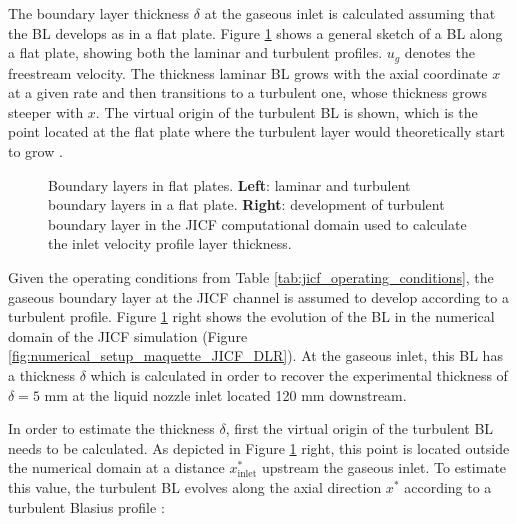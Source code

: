 The boundary layer thickness $\delta$ at the gaseous inlet is calculated assuming that the BL develops as in a flat plate. Figure \ref{fig:BLs_gaseous_inlet_setup} shows a general sketch of a BL along a flat plate, showing both the laminar and turbulent profiles. $u_g$ denotes the freestream velocity. The thickness laminar BL grows with the axial coordinate $x$ at a given rate and then transitions to a turbulent one, whose thickness grows steeper with $x$. The virtual origin of the turbulent BL is shown, which is the point located at the flat plate where the turbulent layer would theoretically start to grow .

\begin{figure}[ht]
     \centering
     \begin{subfigure}[b]{0.45\textwidth}
         \centering
     \end{subfigure}
     \begin{subfigure}[b]{0.45\textwidth} 
         \centering
     \end{subfigure}
        \caption[Boundary layers in flat plates]{Boundary layers in flat plates. \textbf{Left}: laminar and turbulent boundary layers in a flat plate. \textbf{Right}: development of turbulent boundary layer in the JICF computational domain used to calculate the inlet velocity profile layer thickness.}
        \label{fig:BLs_gaseous_inlet_setup}
\end{figure}

Given the operating conditions from Table \ref{tab:jicf_operating_conditions}, the gaseous boundary layer at the JICF channel is assumed to develop according to a turbulent profile. Figure \ref{fig:BLs_gaseous_inlet_setup} right shows the evolution of the BL in the numerical domain of the JICF simulation (Figure \ref{fig:numerical_setup_maquette_JICF_DLR}). At the gaseous inlet, this BL has a thickness $\delta$ which is calculated in order to recover the experimental thickness of $\delta = 5$ mm at the liquid nozzle inlet located 120 mm downstream. 

In order to estimate the thickness $\delta$, first the virtual origin of the turbulent BL needs to be calculated. As depicted in Figure \ref{fig:BLs_gaseous_inlet_setup} right, this point is located outside the numerical domain at a distance $x^*_\mathrm{inlet}$ upstream the gaseous inlet. To estimate this value, the turbulent BL evolves along the axial direction $x^*$ according to a turbulent Blasius profile :

